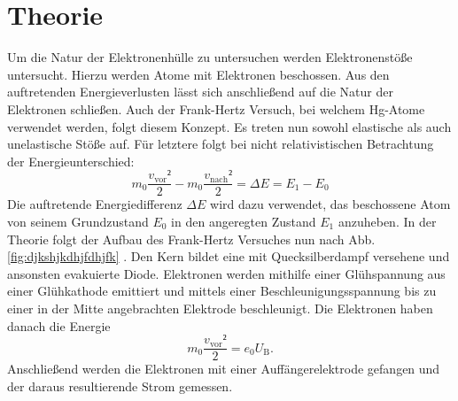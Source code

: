 
\section{Theorie}
\label{sec:Theorie}
Um die Natur der Elektronenhülle zu untersuchen werden Elektronenstöße untersucht.
Hierzu werden Atome mit Elektronen beschossen. Aus den auftretenden Energieverlusten
lässt sich anschließend auf die Natur der Elektronen schließen. Auch der Frank-Hertz
Versuch, bei welchem Hg-Atome verwendet werden,
folgt diesem Konzept. Es treten nun sowohl elastische als auch unelastische Stöße auf.
Für letztere folgt bei nicht relativistischen Betrachtung der Energieunterschied:
\begin{equation}
  m_0 \frac{v_\text{vor}²}{2} - m_0 \frac{v_\text{nach}²}{2} = \Delta E = E_1 - E_0
  \end{equation}
Die auftretende Energiedifferenz $\Delta E$ wird dazu verwendet, das beschossene
Atom von seinem Grundzustand $E_0$ in den angeregten Zustand $E_1$ anzuheben.
In der Theorie folgt der Aufbau des Frank-Hertz Versuches nun nach Abb.
\ref{fig:djkshjkdhjfdhjfk} . Den Kern bildet eine mit Quecksilberdampf versehene und ansonsten evakuierte
Diode. Elektronen werden mithilfe einer Glühspannung aus einer Glühkathode emittiert
und mittels einer Beschleunigungsspannung bis zu einer in der Mitte angebrachten
Elektrode beschleunigt. Die Elektronen haben danach die Energie
\begin{equation}
  m_0 \frac{v_\text{vor}²}{2} = e_0 U_\text{B}\text{.}
  \end{equation}
   Anschließend werden die Elektronen mit einer Auffängerelektrode
gefangen und der daraus resultierende Strom gemessen.







